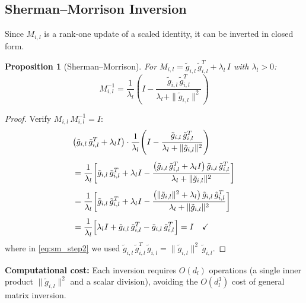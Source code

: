 \documentclass{article}
\newtheorem{proposition}{Proposition}
\begin{document}
\subsection{Sherman--Morrison Inversion}\label{sec:sherman_morrison}

Since $M_{i,l}$ is a rank-one update of a scaled identity, it can be inverted in closed form.

\begin{proposition}[Sherman--Morrison]\label{prop:sm}
For $M_{i,l} = \tilde{g}_{i,l}\,\tilde{g}_{i,l}^T + \lambda_l\,I$ with $\lambda_l > 0$:
\begin{equation}\label{eq:sm}
    M_{i,l}^{-1} = \frac{1}{\lambda_l}\!\left(I - \frac{\tilde{g}_{i,l}\,\tilde{g}_{i,l}^T}{\lambda_l + \|\tilde{g}_{i,l}\|^2}\right)
\end{equation}
\end{proposition}

\begin{proof}
Verify $M_{i,l}\,M_{i,l}^{-1} = I$:
\begin{align}
    &\bigl(\tilde{g}_{i,l}\,\tilde{g}_{i,l}^T + \lambda_l I\bigr)
    \cdot
    \frac{1}{\lambda_l}\!\left(I - \frac{\tilde{g}_{i,l}\,\tilde{g}_{i,l}^T}{\lambda_l + \|\tilde{g}_{i,l}\|^2}\right) \notag\\[4pt]
    &= \frac{1}{\lambda_l}\biggl[
        \tilde{g}_{i,l}\,\tilde{g}_{i,l}^T + \lambda_l I
        - \frac{\bigl(\tilde{g}_{i,l}\,\tilde{g}_{i,l}^T + \lambda_l I\bigr)\,\tilde{g}_{i,l}\,\tilde{g}_{i,l}^T}{\lambda_l + \|\tilde{g}_{i,l}\|^2}
    \biggr] \label{eq:sm_step1}\\[4pt]
    &= \frac{1}{\lambda_l}\biggl[
        \tilde{g}_{i,l}\,\tilde{g}_{i,l}^T + \lambda_l I
        - \frac{\bigl(\|\tilde{g}_{i,l}\|^2 + \lambda_l\bigr)\,\tilde{g}_{i,l}\,\tilde{g}_{i,l}^T}{\lambda_l + \|\tilde{g}_{i,l}\|^2}
    \biggr] \label{eq:sm_step2}\\[4pt]
    &= \frac{1}{\lambda_l}\Bigl[\lambda_l I + \tilde{g}_{i,l}\,\tilde{g}_{i,l}^T - \tilde{g}_{i,l}\,\tilde{g}_{i,l}^T\Bigr]
    = I \quad\checkmark \notag
\end{align}
where in \eqref{eq:sm_step2} we used $\tilde{g}_{i,l}\,\tilde{g}_{i,l}^T\,\tilde{g}_{i,l} = \|\tilde{g}_{i,l}\|^2\,\tilde{g}_{i,l}$.
\end{proof}

\textbf{Computational cost:} Each inversion requires $O(d_l)$ operations (a single inner product $\|\tilde{g}_{i,l}\|^2$ and a scalar division), avoiding the $O(d_l^3)$ cost of general matrix inversion.
\end{document}
